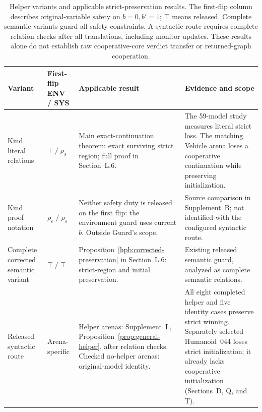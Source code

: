 \begin{table}[tbp]
\centering\small
\caption{Helper variants and applicable strict-preservation results. The first-flip column describes original-variable safety on $b=0,b'=1$; $\top$ means released. Complete semantic variants guard all safety constraints. A syntactic route requires complete relation checks after all translations, including monitor updates. These results alone do not establish raw cooperative-core verdict transfer or returned-graph cooperation.}
\label{tab:helper-variants}
\begin{tabular}{@{}L{28mm}L{23mm}L{40mm}L{53mm}@{}}
\toprule
Variant & First-flip ENV / SYS & Applicable result & Evidence and scope\\
\midrule
Kind~\cite[Sec.~4.1]{kind} literal relations & $\top\;/\;\rho_s$ & Main exact-continuation theorem: exact surviving strict region; full proof in Section~L.6. & The 59-model study measures literal strict loss. The matching Vehicle arena loses a cooperative continuation while preserving initialization.\\[3pt]
Kind~\cite[App.~A]{kind} proof notation & $\rho_e\;/\;\rho_s$ & Neither safety duty is released on the first flip: the environment guard uses current $b$. Outside Guard's scope. & Source comparison in Supplement~B; not identified with the configured syntactic route.\\[3pt]
Complete corrected semantic variant & $\top\;/\;\top$ & Proposition~\ref{hpb:corrected-preservation} in Section~L.6: strict-region and initial preservation. & Existing released semantic guard, analyzed as complete semantic relations.\\[3pt]
Released syntactic route & Arena-specific & Helper arenas: Supplement~L, Proposition~\ref{prop:general-helper}, after relation checks. Checked no-helper arenas: original-model identity. & All eight completed helper and five identity cases preserve strict winning. Separately selected Humanoid~044 loses strict initialization; it already lacks cooperative initialization (Sections~D, Q, and T).\\
\bottomrule
\end{tabular}
\end{table}
